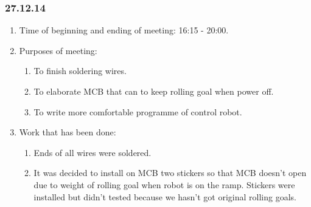 \subsubsection{27.12.14}
\begin{enumerate}
	
	\item Time of beginning and ending of meeting: 16:15 - 20:00.
	
	\item Purposes of meeting: 
	\begin{enumerate}
		
		\item To finish soldering wires.
		
		\item To elaborate MCB that can to keep rolling goal when power off.
		
        \item To write more comfortable programme of control robot.
		
	\end{enumerate}

	\item Work that has been done:
	\begin{enumerate}
		
		\item Ends of all wires were soldered.
		
		\item It was decided to install on MCB two stickers so that MCB doesn't open due to weight of rolling goal when robot is on the ramp. Stickers were installed but didn't tested because we hasn't got original rolling goals.
		

\end{enumerate}
\end{enumerate}
